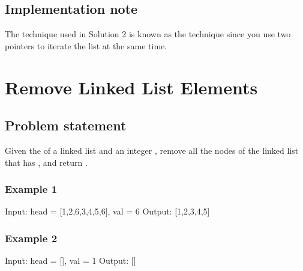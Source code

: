 \documentclass[letterpaper,12pt,english]{book}
\begin{document}
\subsection{Implementation note}
\label{\detokenize{Linked_List/02_LL_160_Intersection_of_Two_Linked_Lists:implementation-note}}
\sphinxAtStartPar
The technique used in Solution 2 is known as the  technique since you use two pointers to iterate the list at the same time.

\sphinxstepscope


\section{Remove Linked List Elements}
\label{\detokenize{Linked_List/02_LL_203_Remove_Linked_List_Elements:remove-linked-list-elements}}\label{\detokenize{Linked_List/02_LL_203_Remove_Linked_List_Elements::doc}}

\subsection{Problem statement\sphinxfootnotemark[19]}
\label{\detokenize{Linked_List/02_LL_203_Remove_Linked_List_Elements:problem-statement}}%
\begin{footnotetext}[19]\sphinxAtStartFootnote
{}
%
\end{footnotetext}\ignorespaces 
\sphinxAtStartPar
Given the  of a linked list and an integer , remove all the nodes of the linked list that has , and return .


\subsubsection{Example 1}
\label{\detokenize{Linked_List/02_LL_203_Remove_Linked_List_Elements:example-1}}
\sphinxAtStartPar
{}

\begin{sphinxVerbatim}[commandchars=\\\{\}]
Input: head = [1,2,6,3,4,5,6], val = 6
Output: [1,2,3,4,5]
\end{sphinxVerbatim}


\subsubsection{Example 2}
\label{\detokenize{Linked_List/02_LL_203_Remove_Linked_List_Elements:example-2}}
\begin{sphinxVerbatim}[commandchars=\\\{\}]
Input: head = [], val = 1
Output: []
\end{sphinxVerbatim}
\end{document}
